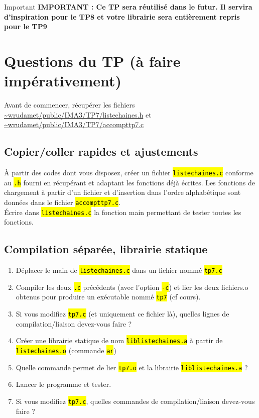 \documentclass[final, a4paper, openbib, ]{article}
\let\OldTexttt\texttt
\renewcommand{\texttt}[1]{\OldTexttt{\hl{#1}}}
\begin{document}

\begin{alertinfo}{Important}
	\textbf{IMPORTANT : Ce TP sera réutilisé dans le futur. Il servira d'inspiration pour le TP8 et votre librairie sera entièrement repris pour le TP9}
\end{alertinfo}

\section{Questions du TP \large (à faire impérativement)}
Avant de commencer, récupérer les fichiers \url{~wrudamet/public/IMA3/TP7/listechaines.h}  et \url{~wrudamet/public/IMA3/TP7/accompttp7.c}

\subsection{Copier/coller rapides et ajustements}
À partir des codes dont vous disposez, créer un fichier \texttt{listechaines.c} conforme au \texttt{.h} fourni en récupérant et adaptant les fonctions déjà écrites. Les fonctions de chargement à partir d'un fichier et d'insertion dans l'ordre alphabétique sont données dans
le fichier \texttt{accompttp7.c}.\\
Écrire dans \texttt{listechaines.c} la fonction main permettant de tester toutes les fonctions.

\subsection{Compilation séparée, librairie statique}
\begin{enumerate}
	\item Déplacer le main de \texttt{listechaines.c} dans un fichier nommé \texttt{tp7.c}
	\item Compiler les deux \texttt{.c} précédents (avec l'option \texttt{-c}) et lier les deux fichiers.o obtenus pour produire un exécutable nommé \texttt{tp7} (cf cours).
	\item Si vous modifiez \texttt{tp7.c} (et uniquement ce fichier là), quelles lignes de compilation/liaison devez-vous faire ?
	\item Créer une librairie statique de nom \texttt{liblistechaines.a} à partir de \texttt{listechaines.o} (commande \texttt{ar})
	\item Quelle commande permet de lier \texttt{tp7.o} et la librairie \texttt{liblistechaines.a} ?
	\item Lancer le programme et tester.
	\item Si vous modifiez \texttt{tp7.c}, quelles commandes de compilation/liaison devez-vous faire ?
\end{enumerate}
\end{document}
